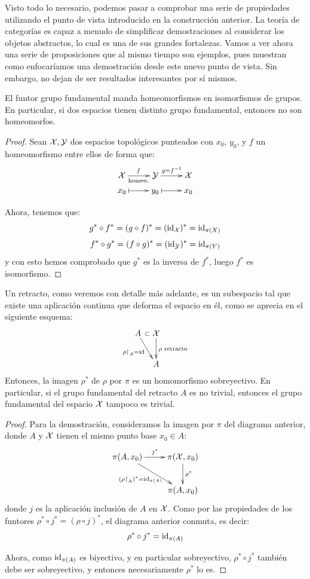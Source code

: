 Visto todo lo necesario, podemos pasar a comprobar una serie de propiedades utilizando el punto de vista introducido en la construcción anterior. La teoría de categorías es capaz a menudo de simplificar demostraciones al considerar los objetos abstractos, lo cual es una de sus grandes fortalezas. Vamos a ver ahora una serie de proposiciones que al mismo tiempo son ejemplos, pues muestran como enfocaríamos una demostración desde este nuevo punto de vista. Sin embargo, no dejan de ser resultados interesantes por sí mismos.

\begin{prop}
	El funtor grupo fundamental manda homeomorfismos en isomorfismos de grupos. En particular, si dos espacios tienen distinto grupo fundamental, entonces no son homeomorfos.
	
	\begin{proof}
		Sean $\mathcal{X},\mathcal{Y}$ dos espacios topológicos punteados con $x_0$, $y_0$, y $f$ un homeomorfismo entre ellos de forma que:
		\[\xymatrix @R=0.4pc {
			\X \ar[r]^f_{\text{homeo.}} & \Y \ar[r]^{g=f^{-1}} & \X \\
			x_0 \ar@{|->}[r] & y_0 \ar@{|->}[r] & x_0
		}\]
		
		Ahora, tenemos que:
		\[g^\ast\circ f^\ast = (g\circ f)^\ast = (\operatorname{\mathrm{id}}_{\mathcal{X}})^\ast = \operatorname{\mathrm{id}}_{\pi(X)}\]
		\[f^\ast\circ g^\ast = (f\circ g)^\ast = (\operatorname{\mathrm{id}}_{\mathcal{Y}})^\ast = \operatorname{\mathrm{id}}_{\pi(Y)}\]
		y con esto hemos comprobado que $g^\ast$ es la inversa de $f^\ast$, luego $f^\ast$ es isomorfismo.
	\end{proof}
\end{prop}

\begin{prop}
	\label{grf_prop_retractos_homo_sobreyectivo}
	Un retracto, como veremos con detalle más adelante, es un subespacio tal que existe una aplicación continua que deforma el espacio en él, como se aprecia en el siguiente esquema:
	\[\xymatrix @C=0.65pc {
		A \ar@{}[r]|\subset \ar[dr]_{\rho\restriction_A = \Id} & \X \ar[d]^{\rho\text{ retracto}} \\
		& A
	}\]
	Entonces, la imagen $\rho^\ast$ de $\rho$ por $\pi$ es un homomorfismo sobreyectivo. En particular, si el grupo fundamental del retracto $A$ es no trivial, entonces el grupo fundamental del espacio $\mathcal{X}$ tampoco es trivial.
	
	\begin{proof}
		Para la demostración, consideramos la imagen por $\pi$ del diagrama anterior, donde $A$ y $\mathcal{X}$ tienen el mismo punto base $x_0\in A$:
		\[\xymatrix {
			\pi(A,x_0) \ar[r]^{j^\ast} \ar[dr]_{(\rho\restriction_A)^\ast = \Id_{\pi(A)}} & \pi(\X,x_0) \ar[d]^{\rho^\ast} \\
			& \pi(A,x_0)
		}\]
		donde $j$ es la aplicación inclusión de $A$ en $\mathcal{X}$. Como por las propiedades de los funtores $\rho^\ast\circ j^\ast=(\rho\circ j)^\ast$, el diagrama anterior conmuta, es decir:
		\[\rho^\ast\circ j^\ast=\operatorname{\mathrm{id}}_{\pi(A)}\]
		
		Ahora, como $\operatorname{\mathrm{id}}_{\pi(A)}$ es biyectivo, y en particular sobreyectivo, $\rho^\ast\circ j^\ast$ también debe ser sobreyectivo, y entonces necesariamente $\rho^\ast$ lo es.
	\end{proof}
\end{prop}


